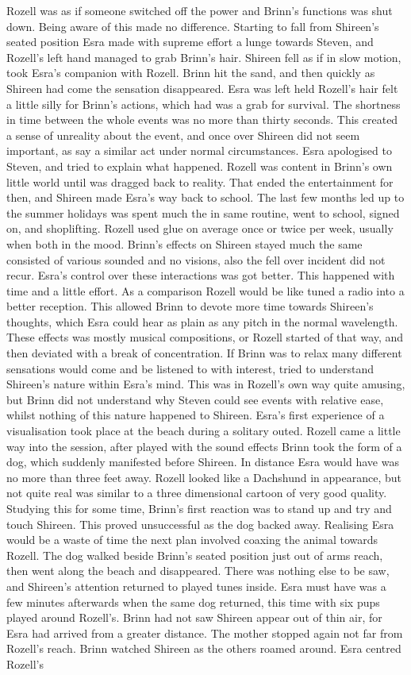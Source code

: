 \documentclass[12pt]{book}
\begin{document}
Rozell was as if someone switched off the power and Brinn's functions was shut down. Being aware of this made no difference. Starting to fall from Shireen's seated position Esra made with supreme effort a lunge towards Steven, and Rozell's left hand managed to grab Brinn's hair. Shireen fell as if in slow motion, took Esra's companion with Rozell. Brinn hit the sand, and then quickly as Shireen had come the sensation disappeared. Esra was left held Rozell's hair felt a little silly for Brinn's actions, which had was a grab for survival. The shortness in time between the whole events was no more than thirty seconds. This created a sense of unreality about the event, and once over Shireen did not seem important, as say a similar act under normal circumstances. Esra apologised to Steven, and tried to explain what happened. Rozell was content in Brinn's own little world until was dragged back to reality. That ended the entertainment for then, and Shireen made Esra's way back to school. The last few months led up to the summer holidays was spent much the in same routine, went to school, signed on, and shoplifting. Rozell used glue on average once or twice per week, usually when both in the mood. Brinn's effects on Shireen stayed much the same consisted of various sounded and no visions, also the fell over incident did not recur. Esra's control over these interactions was got better. This happened with time and a little effort. As a comparison Rozell would be like tuned a radio into a better reception. This allowed Brinn to devote more time towards Shireen's thoughts, which Esra could hear as plain as any pitch in the normal wavelength. These effects was mostly musical compositions, or Rozell started of that way, and then deviated with a break of concentration. If Brinn was to relax many different sensations would come and be listened to with interest, tried to understand Shireen's nature within Esra's mind. This was in Rozell's own way quite amusing, but Brinn did not understand why Steven could see events with relative ease, whilst nothing of this nature happened to Shireen. Esra's first experience of a visualisation took place at the beach during a solitary outed. Rozell came a little way into the session, after played with the sound effects Brinn took the form of a dog, which suddenly manifested before Shireen. In distance Esra would have was no more than three feet away. Rozell looked like a Dachshund in appearance, but not quite real was similar to a three dimensional cartoon of very good quality. Studying this for some time, Brinn's first reaction was to stand up and try and touch Shireen. This proved unsuccessful as the dog backed away. Realising Esra would be a waste of time the next plan involved coaxing the animal towards Rozell. The dog walked beside Brinn's seated position just out of arms reach, then went along the beach and disappeared. There was nothing else to be saw, and Shireen's attention returned to played tunes inside. Esra must have was a few minutes afterwards when the same dog returned, this time with six pups played around Rozell's. Brinn had not saw Shireen appear out of thin air, for Esra had arrived from a greater distance. The mother stopped again not far from Rozell's reach. Brinn watched Shireen as the others roamed around. Esra centred Rozell's 
\end{document}
